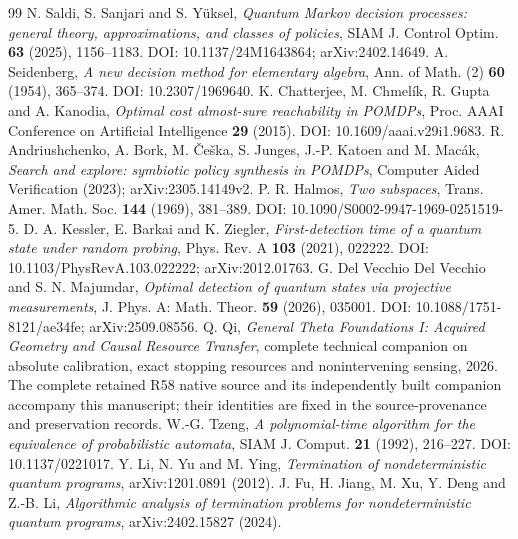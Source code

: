 \begin{thebibliography}{99}
 N. Saldi, S. Sanjari and S. Y\"uksel, \emph{Quantum Markov decision processes: general theory, approximations, and classes of policies}, SIAM J. Control Optim. \textbf{63} (2025), 1156--1183. DOI: 10.1137/24M1643864; arXiv:2402.14649.
 A. Seidenberg, \emph{A new decision method for elementary algebra}, Ann. of Math. (2) \textbf{60} (1954), 365--374. DOI: 10.2307/1969640.
 K. Chatterjee, M. Chmel\'ik, R. Gupta and A. Kanodia, \emph{Optimal cost almost-sure reachability in POMDPs}, Proc. AAAI Conference on Artificial Intelligence \textbf{29} (2015). DOI: 10.1609/aaai.v29i1.9683.
 R. Andriushchenko, A. Bork, M. \v{C}e\v{s}ka, S. Junges, J.-P. Katoen and M. Mac\'ak, \emph{Search and explore: symbiotic policy synthesis in POMDPs}, Computer Aided Verification (2023); arXiv:2305.14149v2.
 P. R. Halmos, \emph{Two subspaces}, Trans. Amer. Math. Soc. \textbf{144} (1969), 381--389. DOI: 10.1090/S0002-9947-1969-0251519-5.
 D. A. Kessler, E. Barkai and K. Ziegler, \emph{First-detection time of a quantum state under random probing}, Phys. Rev. A \textbf{103} (2021), 022222. DOI: 10.1103/PhysRevA.103.022222; arXiv:2012.01763.
 G. Del Vecchio Del Vecchio and S. N. Majumdar, \emph{Optimal detection of quantum states via projective measurements}, J. Phys. A: Math. Theor. \textbf{59} (2026), 035001. DOI: 10.1088/1751-8121/ae34fe; arXiv:2509.08556.
 Q. Qi, \emph{General Theta Foundations I: Acquired Geometry and Causal Resource Transfer}, complete technical companion on absolute calibration, exact stopping resources and nonintervening sensing, 2026. The complete retained R58 native source and its independently built companion accompany this manuscript; their identities are fixed in the source-provenance and preservation records.
 W.-G. Tzeng, \emph{A polynomial-time algorithm for the equivalence of probabilistic automata}, SIAM J. Comput. \textbf{21} (1992), 216--227. DOI: 10.1137/0221017.
 Y. Li, N. Yu and M. Ying, \emph{Termination of nondeterministic quantum programs}, arXiv:1201.0891 (2012).
 J. Fu, H. Jiang, M. Xu, Y. Deng and Z.-B. Li, \emph{Algorithmic analysis of termination problems for nondeterministic quantum programs}, arXiv:2402.15827 (2024).


\end{thebibliography}
